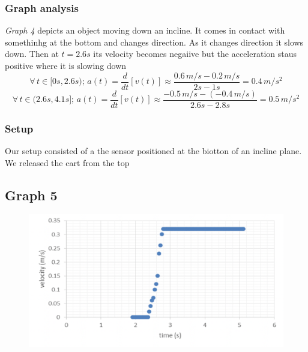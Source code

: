 \documentclass[11pt, letterpaper, includehead]{article}
\begin{document}
  \subsubsection{Graph analysis}
  \emph{Graph 4} depicts an object moving down an incline. It comes in contact with somethinhg at the
  bottom and changes direction. As it changes direction it slows down. Then at $t=2.6s$ its velocity 
  becomes negaiive but the acceleration staus positive where it is slowing down\\
  $$\forall \, t \in [0s, 2.6s); \, a(t) = \frac{d}{dt}[v(t)] \approx \frac{0.6 \, m/s - 0.2 \, m/s}{2s - 1s} = 0.4 \, m/s^2$$
  $$\forall \, t \in (2.6s, 4.1s]; \, a(t) = \frac{d}{dt}[v(t)] \approx \frac{-0.5 \, m/s -(-0.4 \, m/s)}{2.6s - 2.8s} = 0.5 \, m/s^2$$ %
  
  \subsubsection{Setup}
  Our setup consisted of a the sensor positioned at the biotton of an incline plane. We released the cart from the top 

  \subsection{Graph 5}

  \begin{figure}[H] %
    \centering 
    \includegraphics[width=\linewidth]{graph_5.png}
  \end{figure}
\end{document}
